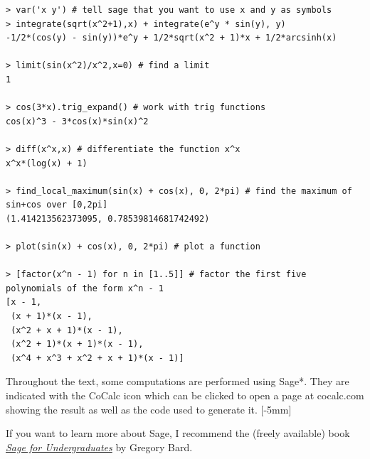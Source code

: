 \documentclass[svgnames]{report}
\begin{document}
\begin{lstlisting}
> var('x y') # tell sage that you want to use x and y as symbols
> integrate(sqrt(x^2+1),x) + integrate(e^y * sin(y), y)
-1/2*(cos(y) - sin(y))*e^y + 1/2*sqrt(x^2 + 1)*x + 1/2*arcsinh(x)

> limit(sin(x^2)/x^2,x=0) # find a limit
1

> cos(3*x).trig_expand() # work with trig functions
cos(x)^3 - 3*cos(x)*sin(x)^2

> diff(x^x,x) # differentiate the function x^x
x^x*(log(x) + 1)

> find_local_maximum(sin(x) + cos(x), 0, 2*pi) # find the maximum of sin+cos over [0,2pi]
(1.414213562373095, 0.78539814681742492)

> plot(sin(x) + cos(x), 0, 2*pi) # plot a function

> [factor(x^n - 1) for n in [1..5]] # factor the first five polynomials of the form x^n - 1
[x - 1,
 (x + 1)*(x - 1),
 (x^2 + x + 1)*(x - 1),
 (x^2 + 1)*(x + 1)*(x - 1),
 (x^4 + x^3 + x^2 + x + 1)*(x - 1)]
\end{lstlisting}

Throughout the text, some computations are performed using Sage*. They
are indicated with the CoCalc icon
\href{http://cocalc.com}{\cocalc} which can be clicked to
open a page at cocalc.com showing the result as well as the
code used to generate it. [-5mm]

If you want to learn more about Sage, I recommend the (freely
available) book
\href{http://www.gregorybard.com/Sage.html}{\textit{Sage for
    Undergraduates}} by Gregory Bard.
\end{document}
